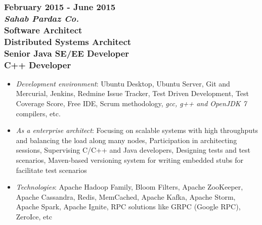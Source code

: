 \documentclass[10pt,a4paper]{article}
\begin{document}
  \setlength{\leftskip}{0pt}
  \setlength{\rightskip}{0cm}
	  
\subsubsection{{February 2015 - June 2015} \\ \textnormal {\textit {Sahab Pardaz Co.}} \\ {Software Architect \\ Distributed Systems Architect \\ Senior Java SE/EE Developer \\ C++ Developer}}
	\setlength{\leftskip}{0.5cm}
  \setlength{\rightskip}{1cm}
  \begin{itemize}
    \setlength{\rightskip}{1cm}
    \setlength\itemsep{0em}
    \item \small \textit {Development environment}: Ubuntu Desktop, Ubuntu Server, Git and Mercurial, Jenkins, Redmine Issue Tracker, Test Driven Development, Test Coverage Score, Free IDE, Scrum methodology, \textit {gcc, g++ and OpenJDK 7} compilers, etc.
    \item \small \textit {As a enterprise architect}: Focusing on scalable systems with high throughputs and balancing the load along many nodes, Participation in architecting sessions, Supervising C/C++ and Java developers, Designing tests and test scenarios, Maven-based versioning system for writing embedded stubs for facilitate test scenarios
    \item \small \textit {Technologies}: Apache Hadoop Family, Bloom Filters, Apache ZooKeeper, Apache Cassandra, Redis, MemCached, Apache Kafka, Apache Storm, Apache Spark, Apache Ignite, RPC solutions like GRPC (Google RPC), ZeroIce, etc
  \end{itemize}
  \setlength{\leftskip}{0pt}
  \setlength{\rightskip}{0cm}
	  
\end{document}
